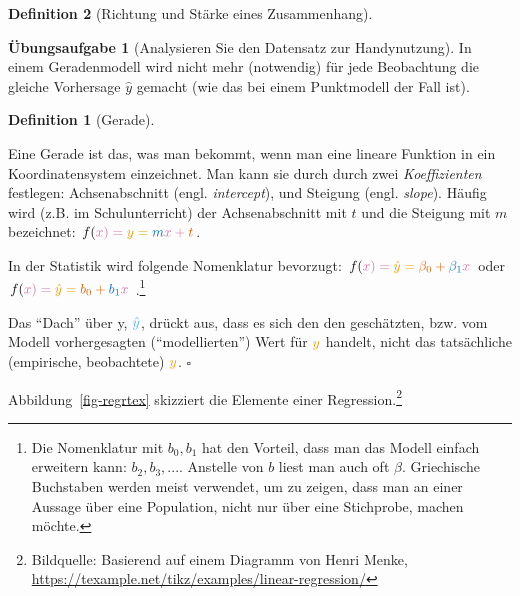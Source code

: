 \documentclass[
  a4paper,
  DIV=11]{scrreprt}
\theoremstyle{definition}
\newtheorem{exercise}{Übungsaufgabe}[chapter]
\theoremstyle{definition}
\theoremstyle{definition}
\newtheorem{definition}{Definition}[chapter]
\theoremstyle{remark}
\begin{document}
\begin{definition}[Richtung und Stärke eines
Zusammenhang]
\begin{exercise}[Analysieren Sie den Datensatz zur
Handynutzung]
In einem Geradenmodell wird nicht mehr (notwendig) für jede Beobachtung
die gleiche Vorhersage \(\hat{y}\) gemacht (wie das bei einem
Punktmodell der Fall ist).

\begin{definition}[Gerade]\protect\hypertarget{def-gerade}{}\label{def-gerade}

Eine Gerade ist das, was man bekommt, wenn man eine lineare Funktion in
ein Koordinatensystem einzeichnet. Man kann sie durch durch zwei
\emph{Koeffizienten} festlegen: Achsenabschnitt (engl.
\emph{intercept}), und Steigung (engl. \emph{slope}). Häufig wird (z.B.
im Schulunterricht) der Achsenabschnitt mit \(t\) und die Steigung mit
\(m\) bezeichnet:
\(f(\color{xcol}{x})=\color{ycol}{y}=\color{beta1col}{m} \color{xcol}{x} + \color{beta0col}{t}\).

In der Statistik wird folgende Nomenklatur bevorzugt:
\(f(\color{xcol}{x})=\color{ycol}{\hat{y}}=\color{beta0col}{\beta_0} + \color{beta1col}{\beta_1} \color{xcol}{x}\)
oder
\(f(\color{xcol}{x})=\color{ycol}{\hat{y}}= \color{beta0col}{b_0} + \color{beta1col}{b_1} \color{xcol}{x}\)
.\footnote{Die Nomenklatur mit \(b_0, b_1\) hat den Vorteil, dass man
  das Modell einfach erweitern kann: \(b_2, b_3, ...\). Anstelle von
  \(b\) liest man auch oft \(\beta\). Griechische Buchstaben werden
  meist verwendet, um zu zeigen, dass man an einer Aussage über eine
  Population, nicht nur über eine Stichprobe, machen möchte.}

Das ``Dach'' über y, \(\color{modelcol}{\hat{y}}\), drückt aus, dass es
sich den den geschätzten, bzw. vom Modell vorhergesagten
(``modellierten'') Wert für \(\color{ycol}{y}\) handelt, nicht das
tatsächliche (empirische, beobachtete) \(\color{ycol}{y}\). \(\square\)

\end{definition}

Abbildung~\ref{fig-regrtex} skizziert die Elemente einer
Regression.\footnote{Bildquelle: Basierend auf einem Diagramm von Henri
  Menke, \url{https://texample.net/tikz/examples/linear-regression/}}

\begin{figure}

\end{figure}
\end{exercise}
\end{definition}
\end{document}
